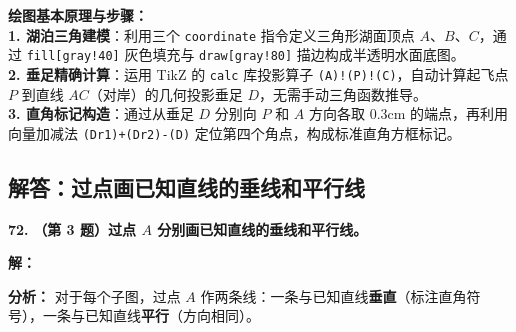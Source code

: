 \vspace{0.6cm}

{\small\color{blue!70!black}
\textbf{绘图基本原理与步骤：}\\
\textbf{1. 湖泊三角建模}：利用三个 \texttt{coordinate} 指令定义三角形湖面顶点 $A$、$B$、$C$，通过 \texttt{fill[gray!40]} 灰色填充与 \texttt{draw[gray!80]} 描边构成半透明水面底图。\\
\textbf{2. 垂足精确计算}：运用 TikZ 的 \texttt{calc} 库投影算子 \texttt{(A)!(P)!(C)}，自动计算起飞点 $P$ 到直线 $AC$（对岸）的几何投影垂足 $D$，无需手动三角函数推导。\\
\textbf{3. 直角标记构造}：通过从垂足 $D$ 分别向 $P$ 和 $A$ 方向各取 0.3cm 的端点，再利用向量加减法 \texttt{(Dr1)+(Dr2)-(D)} 定位第四个角点，构成标准直角方框标记。
}


\newpage

\newpage

\subsection{解答：过点画已知直线的垂线和平行线}

\vspace{0.6cm}

\textbf{\LARGE 72.} \textbf{（第 3 题）过点 $A$ 分别画已知直线的垂线和平行线。}

\vspace{0.4cm}
\textbf{解：}

\vspace{0.2cm}
\textbf{分析：} 对于每个子图，过点 $A$ 作两条线：一条与已知直线\textbf{垂直}（标注直角符号），一条与已知直线\textbf{平行}（方向相同）。

